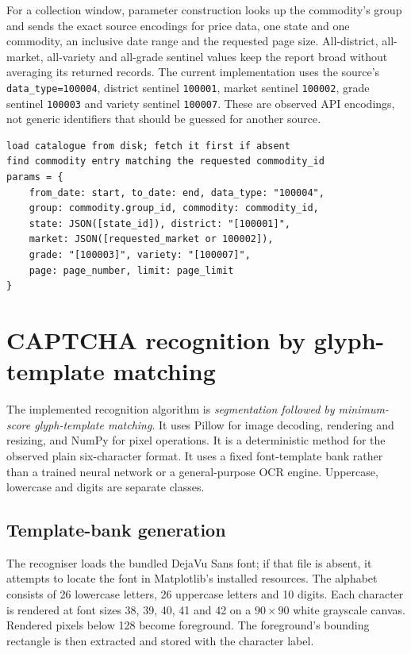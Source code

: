 \documentclass[12pt,a4paper,oneside]{report}
\numberwithin{equation}{chapter}
\numberwithin{figure}{chapter}
\numberwithin{table}{chapter}
\theoremstyle{definition}
\begin{document}
For a collection window, parameter construction looks up the commodity's group and sends the exact source encodings for price data, one state and one commodity, an inclusive date range and the requested page size. All-district, all-market, all-variety and all-grade sentinel values keep the report broad without averaging its returned records. The current implementation uses the source's \texttt{data\_type=100004}, district sentinel \texttt{100001}, market sentinel \texttt{100002}, grade sentinel \texttt{100003} and variety sentinel \texttt{100007}. These are observed API encodings, not generic identifiers that should be guessed for another source.

\begin{lstlisting}[caption={Catalogue-based parameter construction, simplified}]
load catalogue from disk; fetch it first if absent
find commodity entry matching the requested commodity_id
params = {
    from_date: start, to_date: end, data_type: "100004",
    group: commodity.group_id, commodity: commodity_id,
    state: JSON([state_id]), district: "[100001]",
    market: JSON([requested_market or 100002]),
    grade: "[100003]", variety: "[100007]",
    page: page_number, limit: page_limit
}
\end{lstlisting}

\section{CAPTCHA recognition by glyph-template matching}
\label{sec:ocr}
The implemented recognition algorithm is \emph{segmentation followed by minimum-score glyph-template matching}. It uses Pillow for image decoding, rendering and resizing, and NumPy for pixel operations. It is a deterministic method for the observed plain six-character format. It uses a fixed font-template bank rather than a trained neural network or a general-purpose OCR engine. Uppercase, lowercase and digits are separate classes.

\subsection{Template-bank generation}
The recogniser loads the bundled DejaVu Sans font; if that file is absent, it attempts to locate the font in Matplotlib's installed resources. The alphabet consists of 26 lowercase letters, 26 uppercase letters and 10 digits. Each character is rendered at font sizes 38, 39, 40, 41 and 42 on a $90\times90$ white grayscale canvas. Rendered pixels below 128 become foreground. The foreground's bounding rectangle is then extracted and stored with the character label.
\end{document}
